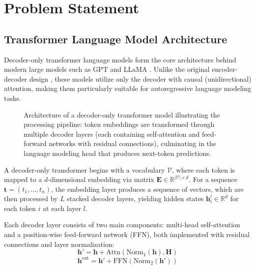 \chapter{Problem Statement}

\section{Transformer Language Model Architecture}

Decoder-only transformer language models form the core architecture behind modern large models such as GPT \cite{brown2020language} and LLaMA \cite{touvron2023llama}. Unlike the original encoder-decoder design \cite{vaswani2017attention}, these models utilize only the decoder with causal (unidirectional) attention, making them particularly suitable for autoregressive language modeling tasks.

\begin{figure}[h]
    \centering
    \caption{Architecture of a decoder-only transformer model illustrating the processing pipeline: token embeddings are transformed through multiple decoder layers (each containing self-attention and feed-forward networks with residual connections), culminating in the language modeling head that produces next-token predictions.}
    \label{fig:transformer_architecture}
\end{figure}

A decoder-only transformer begins with a vocabulary $\mathcal{V}$, where each token is mapped to a $d$-dimensional embedding via matrix $\mathbf{E} \in \mathbb{R}^{|\mathcal{V}| \times d}$. For a sequence $\mathbf{t} = (t_1, \ldots, t_n)$, the embedding layer produces a sequence of vectors, which are then processed by $L$ stacked decoder layers, yielding hidden states $\mathbf{h}_i^l \in \mathbb{R}^d$ for each token $i$ at each layer $l$.

Each decoder layer consists of two main components: multi-head self-attention and a position-wise feed-forward network (FFN), both implemented with residual connections and layer normalization:
\begin{equation}
\mathbf{h}' = \mathbf{h} + \text{Attn}(\text{Norm}_1(\mathbf{h}), \mathbf{H})
\end{equation}
\begin{equation}
\mathbf{h}^{\text{out}} = \mathbf{h}' + \text{FFN}(\text{Norm}_2(\mathbf{h}'))
\end{equation}

